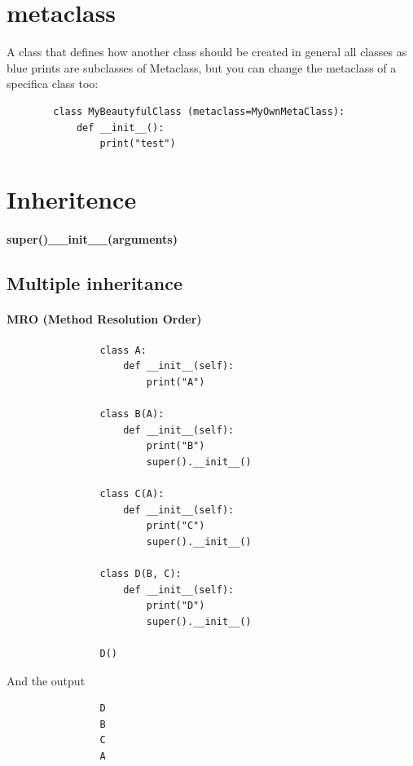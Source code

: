 \section{metaclass}
    A class that defines how another class should be created in general all classes as blue prints are subclasses of Metaclass, but you can change the metaclass of a specifica class too:
    
    \begin{verbatim}
        class MyBeautyfulClass (metaclass=MyOwnMetaClass):
            def __init__():
                print("test")
    \end{verbatim}

\section{Inheritence}
    \paragraph{super()\_\_init\_\_(arguments)}
    \subsection{Multiple inheritance}
        \paragraph{MRO (Method Resolution Order)}
            \begin{verbatim}
                class A:
                    def __init__(self):
                        print("A")
                
                class B(A):
                    def __init__(self):
                        print("B")
                        super().__init__()
                
                class C(A):
                    def __init__(self):
                        print("C")
                        super().__init__()
                
                class D(B, C):
                    def __init__(self):
                        print("D")
                        super().__init__()
                
                D()
            \end{verbatim}
            And the output
            \begin{verbatim}
                D
                B
                C
                A
            \end{verbatim}
    
